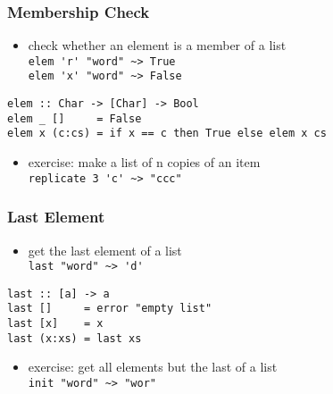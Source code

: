 \documentclass[dvipsnames]{beamer}
\theoremstyle{plain}
\begin{document}
\begin{frame}[fragile]
  \frametitle{Membership Check}

  \begin{itemize}
    \item check whether an element is a member of a list\\
      \lstinline[style=exclamfix]|elem 'r' "word" ~> True|\\
      \lstinline[style=exclamfix]|elem 'x' "word" ~> False|
  \end{itemize}

  \begin{exampleblock}{}
    \begin{lstlisting}[deletekeywords={elem}]
elem :: Char -> [Char] -> Bool
elem _ []     = False
elem x (c:cs) = if x == c then True else elem x cs
    \end{lstlisting}
  \end{exampleblock}

  \pause
  \begin{itemize}
    \item exercise: make a list of n copies of an item\\
      \lstinline|replicate 3 'c' ~> "ccc"|
  \end{itemize}
\end{frame}

\begin{frame}[fragile]
  \frametitle{Last Element}

  \begin{itemize}
    \item get the last element of a list\\
      \lstinline[style=exclamfix]|last "word" ~> 'd'|
  \end{itemize}

  \begin{exampleblock}{}
    \begin{lstlisting}[deletekeywords={last}]
last :: [a] -> a
last []     = error "empty list"
last [x]    = x
last (x:xs) = last xs
    \end{lstlisting}
  \end{exampleblock}

  \pause
  \begin{itemize}
    \item exercise: get all elements but the last of a list\\
      \lstinline[style=exclamfix]|init "word" ~> "wor"|
  \end{itemize}
\end{frame}
\end{document}
